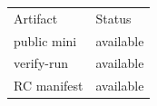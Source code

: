 \begin{tabular}{ll}Artifact & Status \\ public mini & available \\ verify-run & available \\ RC manifest & available \\\end{tabular}
